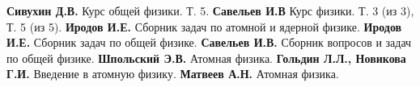 \begin{thebibliography}{9}
     \textbf{Сивухин Д.В.} Курс общей физики. Т. 5.
     \textbf{Савельев И.В} Курс физики. Т. 3 (из 3), Т. 5 (из 5).
     \textbf{Иродов И.Е.} Сборник задач по атомной и ядерной физике.
     \textbf{Иродов И.Е.} Сборник задач по общей физике.
     \textbf{Савельев И.В.} Сборник вопросов и задач по общей физике.
     \textbf{Шпольский Э.В.} Атомная физика.
     \textbf{Гольдин Л.Л., Новикова Г.И.} Введение в атомную физику.
     \textbf{Матвеев А.Н.} Атомная физика.
\end{thebibliography}